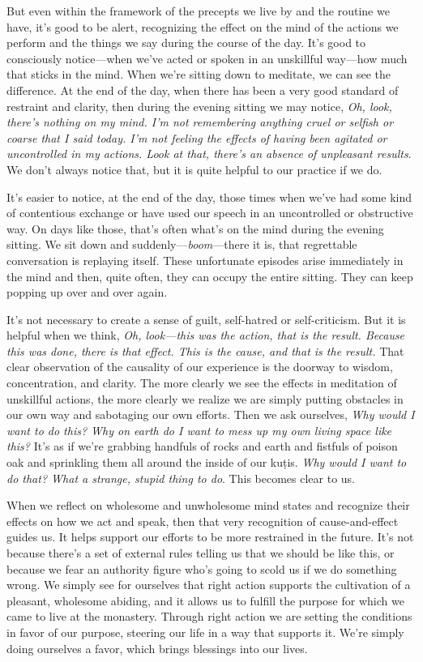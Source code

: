 But even within the framework of the precepts we live by and the 
routine we have, it's good to be alert, recognizing the effect on the 
mind of the actions we perform and the things we say during the course 
of the day. It's good to consciously notice---when we've acted or 
spoken in an unskillful way---how much that sticks in the mind. When 
we're sitting down to meditate, we can see the difference. At the end 
of the day, when there has been a very good standard of restraint and 
clarity, then during the evening sitting we may notice, \emph{Oh, look, 
there's nothing on my mind. I'm not remembering anything cruel or 
selfish or coarse that I said today. I'm not feeling the effects of 
having been agitated or uncontrolled in my actions. Look at that, 
there's an absence of unpleasant results}. We don't always notice that, 
but it is quite helpful to our practice if we do.

It's easier to notice, at the end of the day, those times when we've 
had some kind of contentious exchange or have used our speech in an 
uncontrolled or obstructive way. On days like those, that's often 
what's on the mind during the evening sitting. We sit down and 
suddenly---\emph{boom}---there it is, that regrettable conversation is 
replaying itself. These unfortunate episodes arise immediately in the 
mind and then, quite often, they can occupy the entire sitting. They 
can keep popping up over and over again.

It's not necessary to create a sense of guilt, self-hatred or 
self-criticism. But it is helpful when we think, \emph{Oh, look---this 
was the action, that is the result. Because this was done, there is 
that effect. This is the cause, and that is the result.} That clear 
observation of the causality of our experience is the doorway to 
wisdom, concentration, and clarity. The more clearly we see the effects 
in meditation of unskillful actions, the more clearly we realize we are 
simply putting obstacles in our own way and sabotaging our own efforts. 
Then we ask ourselves, \emph{Why would I want to do this? Why on earth 
do I want to mess up my own living space like this?} It's as if we're 
grabbing handfuls of rocks and earth and fistfuls of poison oak and 
sprinkling them all around the inside of our kuṭis. \emph{Why would I 
want to do that? What a strange, stupid thing to do}. This becomes 
clear to us.

When we reflect on wholesome and unwholesome mind states and recognize 
their effects on how we act and speak, then that very recognition of 
cause-and-effect guides us. It helps support our efforts to be more 
restrained in the future. It's not because there's a set of external 
rules telling us that we should be like this, or because we fear an 
authority figure who's going to scold us if we do something wrong. We 
simply see for ourselves that right action supports the cultivation of 
a pleasant, wholesome abiding, and it allows us to fulfill the purpose 
for which we came to live at the monastery. Through right action we are 
setting the conditions in favor of our purpose, steering our life in a 
way that supports it. We're simply doing ourselves a favor, which 
brings blessings into our lives.

